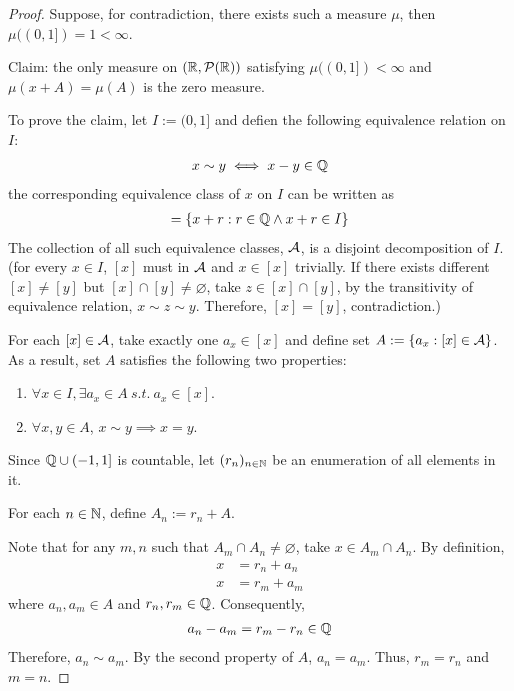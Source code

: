 \documentclass[11pt]{article}
\begin{document}
	\begin{proof}
		Suppose, for contradiction, there exists such a measure $\mu$, then $\mu((0, 1]) = 1 < \infty$.
		
		Claim: the only measure on $(\mathbb{R}, \mathcal{{P}}(\mathbb{R}))$ satisfying $\mu((0, 1]) < \infty$ and $\mu(x+A) = \mu(A)$ is the zero measure.
		
		To prove the claim, let $I := (0, 1]$ and defien the following equivalence relation on $I$:
		\begin{align}
			x \sim y \iff x - y \in \mathbb{Q}
		\end{align}
		the corresponding equivalence class of $x$ on $I$ can be written as
		\begin{align}
			[x] = \{x+r: r \in \Q \land x+r \in I\}
		\end{align}
		The collection of all such equivalence classes, $\mathcal{{A}}$, is a disjoint decomposition of $I$. (for every $x \in I$, $[x]$ must in $\mathcal{{A}}$ and $x \in [x]$ trivially. If there exists different $[x] \neq [y]$ but $[x] \cap [y] \neq \varnothing$, take $z \in [x] \cap [y]$, by the transitivity of equivalence relation, $x \sim z \sim y$. Therefore, $[x] = [y]$, contradiction.)
		
		For each $[x] \in \mathcal{{A}}$, take exactly one $a_x \in [x]$ and define set $A := \{a_x: [x] \in \mathcal{{A}}\}$. As a result, set $A$ satisfies the following two properties:
		\begin{enumerate}
			\item $\forall x \in I, \exists a_x \in A\ s.t.\ a_x \in [x]$.
			\item $\forall x, y \in A$, $x \sim y \implies x = y$.
		\end{enumerate}
		Since $\mathbb{Q} \cup (-1, 1]$ is countable, let $(r_n)_{n \in \mathbb{N}}$ be an enumeration of all elements in it.
		
		For each $n \in \mathbb{N}$, define $A_n := r_n + A$.
		
		Note that for any $m, n$ such that $A_m \cap A_n \neq \varnothing$, take $x \in A_m \cap A_n$. By definition, 
		\begin{align}
				x &= r_n + a_n \\
				x &= r_m + a_m
		\end{align}
		where $a_n, a_m \in A$ and $r_n, r_m \in \mathbb{Q}$. Consequently,
		\begin{align}
			a_n - a_m = r_m - r_n \in \mathbb{Q}
		\end{align}
		Therefore, $a_n \sim a_m$. By the second property of $A$, $a_n = a_m$. Thus, $r_m = r_n$ and $m = n$.
		

\end{proof}
\end{document}

